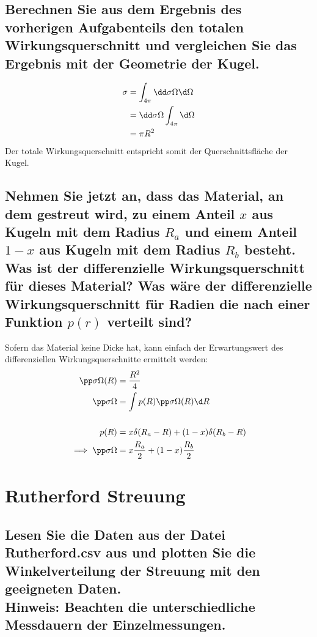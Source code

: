 \documentclass[ex, minted]{exercise_4.1}
\begin{document}
\subsection{Berechnen Sie aus dem Ergebnis des vorherigen Aufgabenteils den totalen Wirkungsquerschnitt und vergleichen Sie das Ergebnis mit der Geometrie der Kugel.}

\dottedlinete

\begin{align*}
    \sigma 
    &= \int_{4\pi} \dd \sigma \Omega \d\Omega \\  
    &= \dd \sigma \Omega\int_{4\pi} \d\Omega \\  
    &= \pi R^2
\end{align*}
Der totale Wirkungsquerschnitt entspricht somit der Querschnittsfläche der Kugel.

\subsection{Nehmen Sie jetzt an, dass das Material, an dem gestreut wird, zu einem Anteil \(x\) aus Kugeln mit dem Radius \(R_a\) und einem Anteil \(1-x\) aus Kugeln mit dem Radius \(R_b\) besteht. Was ist der differenzielle Wirkungsquerschnitt für dieses Material? Was wäre der differenzielle Wirkungsquerschnitt für Radien die nach einer Funktion \(p(r)\) verteilt sind?}

\dottedlinett

Sofern das Material keine Dicke hat, kann einfach der Erwartungswert  des differenziellen Wirkungsquerschnitte ermittelt werden:
\begin{align*}
    \pp \sigma \Omega (R) &= \frac {R^2} 4\\
    \pp \sigma \Omega &= \int p(R) \pp \sigma \Omega (R)\d R\\
    \\
    p(R) &= x \delta(R_a-R) + (1-x)\delta(R_b-R)\\
    \implies \pp \sigma \Omega &= x\frac{R_a}{2} + (1-x)\frac{R_b}{2}
\end{align*}

\newpage
\section{Rutherford Streuung}
\subsection{Lesen Sie die Daten aus der Datei Rutherford.csv aus und plotten Sie die Winkelverteilung der Streuung mit den geeigneten Daten.\\
Hinweis: Beachten die unterschiedliche Messdauern der Einzelmessungen.}
\end{document}
